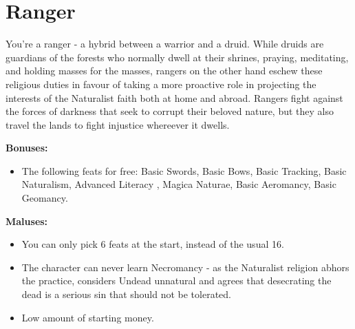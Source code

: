 \section{Ranger}
You're a ranger - a hybrid between a warrior and a druid. While druids are guardians of the forests who normally dwell at their shrines, praying, meditating, and holding masses for the masses, rangers on the other hand eschew these religious duties in favour of taking a more proactive role in projecting the interests of the Naturalist faith both at home and abroad. Rangers fight against the forces of darkness that seek to corrupt their beloved nature, but they also travel the lands to fight injustice whereever it dwells.


\textbf{Bonuses:}
\begin{itemize}
	\item The following feats for free: Basic Swords, Basic Bows, Basic Tracking, Basic Naturalism, Advanced Literacy , Magica Naturae, Basic Aeromancy, Basic Geomancy.
\end{itemize}
\textbf{Maluses:}
\begin{itemize}
	\item You can only pick 6 feats at the start, instead of the usual 16.
	\item The character can never learn Necromancy - as the Naturalist religion abhors the practice, considers Undead unnatural and agrees that desecrating the dead is a serious sin that should not be tolerated.
	\item Low amount of starting money.
\end{itemize}
